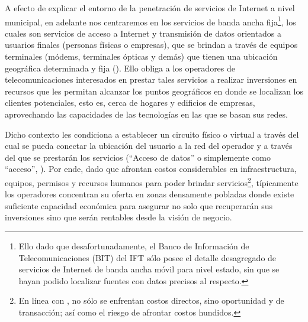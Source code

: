 \documentclass[9pt,twocolumn,twoside]{ilcss}
\begin{document}
A efecto de explicar el entorno de la penetración de servicios de Internet a nivel municipal, en adelante nos centraremos en los servicios de banda ancha fija\footnote{Ello dado que desafortunadamente, el Banco de Información de Telecomunicaciones (BIT) del IFT sólo posee el detalle desagregado de servicios de Internet de banda ancha móvil para nivel estado, sin que se hayan podido localizar fuentes con datos precisos al respecto.}, los cuales son servicios de acceso a Internet y transmisión de datos orientados a usuarios finales (personas físicas o empresas), que se brindan a través de equipos terminales (módems, terminales ópticas y demás) que tienen una ubicación geográfica determinada y fija (\cite{IFT2018man}). Ello obliga a los operadores de telecomunicaciones interesados en prestar tales servicios a realizar inversiones en recursos que les permitan alcanzar los puntos geográficos en donde se localizan los clientes potenciales, esto es, cerca de hogares y edificios de empresas, aprovechando las capacidades de las tecnologías en las que se basan sus redes. 

Dicho contexto les condiciona a establecer un circuito físico o virtual a través del cual se pueda conectar la ubicación del usuario a la red del operador y a través del que se prestarán los servicios (“Acceso de datos” o simplemente como “acceso”, \cite{IFT2018man}). Por ende, dado que afrontan costos considerables en infraestructura, equipos, permisos y recursos humanos para poder brindar servicios\footnote{En línea con \cite{IFT2017reb}, no sólo se enfrentan costos directos, sino oportunidad y de transacción; así como el riesgo de afrontar costos hundidos.}, típicamente los operadores concentran su oferta en zonas densamente pobladas donde existe suficiente capacidad económica para asegurar no solo que recuperarán sus inversiones sino que serán rentables desde la visión de negocio.

	
\end{document}
